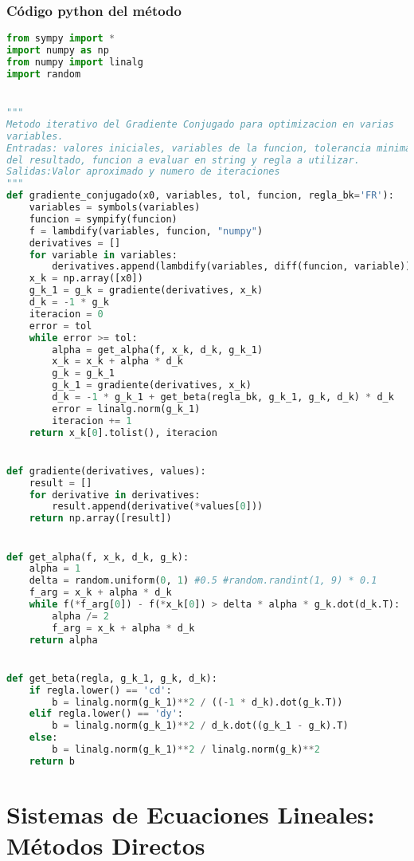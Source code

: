 \documentclass[12pt]{article}
\begin{document}
\subsubsection{Código python del método}
\begin{lstlisting}[language=Python, caption=Implementación del método del Gradiente Conjugado en Python] 
from sympy import *
import numpy as np
from numpy import linalg
import random


"""
Metodo iterativo del Gradiente Conjugado para optimizacion en varias
variables.
Entradas: valores iniciales, variables de la funcion, tolerancia minima
del resultado, funcion a evaluar en string y regla a utilizar.
Salidas:Valor aproximado y numero de iteraciones
"""
def gradiente_conjugado(x0, variables, tol, funcion, regla_bk='FR'):
    variables = symbols(variables)
    funcion = sympify(funcion)
    f = lambdify(variables, funcion, "numpy")
    derivatives = []
    for variable in variables:
        derivatives.append(lambdify(variables, diff(funcion, variable)))
    x_k = np.array([x0])
    g_k_1 = g_k = gradiente(derivatives, x_k)
    d_k = -1 * g_k
    iteracion = 0
    error = tol
    while error >= tol:
        alpha = get_alpha(f, x_k, d_k, g_k_1)
        x_k = x_k + alpha * d_k
        g_k = g_k_1
        g_k_1 = gradiente(derivatives, x_k)
        d_k = -1 * g_k_1 + get_beta(regla_bk, g_k_1, g_k, d_k) * d_k
        error = linalg.norm(g_k_1)
        iteracion += 1
    return x_k[0].tolist(), iteracion


def gradiente(derivatives, values):
    result = []
    for derivative in derivatives:
        result.append(derivative(*values[0]))
    return np.array([result])


def get_alpha(f, x_k, d_k, g_k):
    alpha = 1
    delta = random.uniform(0, 1) #0.5 #random.randint(1, 9) * 0.1
    f_arg = x_k + alpha * d_k
    while f(*f_arg[0]) - f(*x_k[0]) > delta * alpha * g_k.dot(d_k.T):
        alpha /= 2
        f_arg = x_k + alpha * d_k
    return alpha


def get_beta(regla, g_k_1, g_k, d_k):
    if regla.lower() == 'cd':
        b = linalg.norm(g_k_1)**2 / ((-1 * d_k).dot(g_k.T))
    elif regla.lower() == 'dy':
        b = linalg.norm(g_k_1)**2 / d_k.dot((g_k_1 - g_k).T)
    else:
        b = linalg.norm(g_k_1)**2 / linalg.norm(g_k)**2
    return b

\end{lstlisting}


\section{Sistemas de Ecuaciones Lineales: Métodos Directos}
\end{document}
